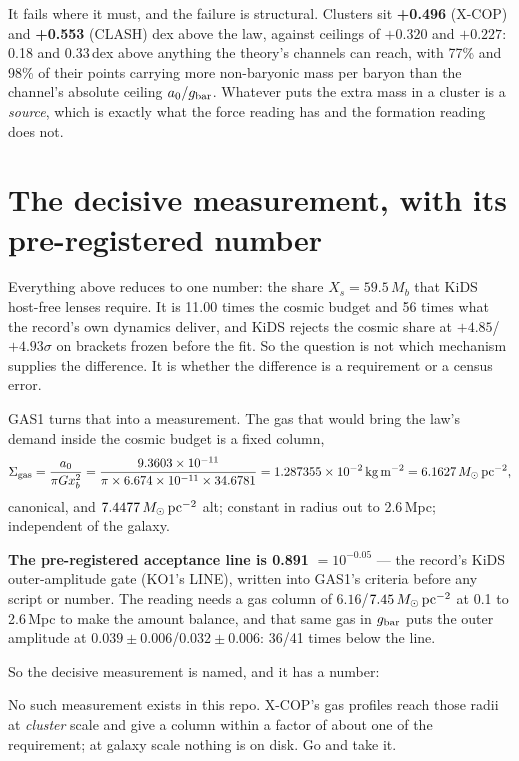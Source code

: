 \documentclass[10pt]{article}
\begin{document}
It fails where it must, and the failure is structural. Clusters sit {\bf +0.496} (X-COP) and {\bf +0.553} (CLASH) dex
above the law, against ceilings of $+0.320$ and $+0.227$: 0.18 and 0.33\,dex above anything the theory's channels can
reach, with 77\% and 98\% of their points carrying more non-baryonic mass per baryon than the channel's absolute ceiling
$a_0/g_{\rm bar}$. Whatever puts the extra mass in a cluster is a {\it source}, which is exactly what the force reading has
and the formation reading does not.

\section{The decisive measurement, with its pre-registered number}
Everything above reduces to one number: the share $X_s=59.5\,M_b$ that KiDS host-free lenses require. It is 11.00 times
the cosmic budget and 56 times what the record's own dynamics deliver, and KiDS rejects the cosmic share at
$+4.85$/$+4.93\sigma$ on brackets frozen before the fit. So the question is not which mechanism supplies the
difference. It is whether the difference is a requirement or a census error.

GAS1 turns that into a measurement. The gas that would bring the law's demand inside the cosmic budget is a fixed
column,
\[
\Sigma_{\rm gas}=\frac{a_0}{\pi G x_b^{2}}=\frac{9.3603\times10^{-11}}{\pi\times6.674\times10^{-11}\times34.6781}
=1.287355\times10^{-2}\,{\rm kg\,m^{-2}}=6.1627\,M_\odot\,{\rm pc}^{-2},
\]
canonical, and $7.4477\,M_\odot\,{\rm pc}^{-2}$ alt; constant in radius out to 2.6\,Mpc; independent of the galaxy.

{\bf The pre-registered acceptance line is 0.891} $=10^{-0.05}$ --- the record's KiDS outer-amplitude gate
(KO1's LINE), written into GAS1's criteria before any script or number. The reading needs a gas column of
$6.16$/$7.45\,M_\odot\,{\rm pc}^{-2}$ at 0.1 to 2.6\,Mpc to make the amount balance, and that same gas
in $g_{\rm bar}$ puts the outer amplitude at $0.039\pm0.006$/$0.032\pm0.006$: 36/41 times below the line.

So the decisive measurement is named, and it has a number:
\begin{center}
\end{center}
No such measurement exists in this repo. X-COP's gas profiles reach those radii at {\it cluster} scale and give a
column within a factor of about one of the requirement; at galaxy scale nothing is on disk. Go and take it.
\end{document}
